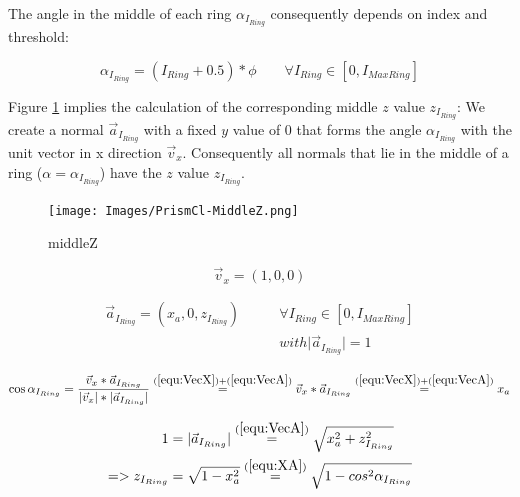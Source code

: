 \documentclass[../ClassicThesis.tex]{subfiles}
\begin{document}
The angle in the middle of each ring ${\alpha}_{I_{Ring}}$ consequently depends on index and threshold:

\begin{equation}
\label{equ:AlphaIRing}
    {\alpha}_{I_{Ring}} = (I_{Ring} + 0.5) * \phi \qquad \forall{ I_{Ring} \in [0, I_{MaxRing}] }
\end{equation}



Figure \ref{fig:middleZ} implies the calculation of the corresponding middle $z$ value $z_{I_{Ring}}$: We create a normal $\vec{a}_{I_{Ring}}$ with a fixed $y$ value of 0 that forms the angle ${\alpha}_{I_{Ring}}$ with the unit vector in x direction $\vec{v}_{x}$. Consequently all normals that lie in the middle of a ring ($\alpha = {\alpha}_{I_{Ring}}$) have the $z$ value $z_{I_{Ring}}$.

\begin{figure}
    \texttt{[image: Images/PrismCl-MiddleZ.png]}
    \caption{middleZ}
    \label{fig:middleZ}
\end{figure}

\begin{equation}
\label{equ:VecX}
    \vec{v}_{x} = (1, 0, 0)
\end{equation}

\begin{equation}
\begin{split}
    \label{equ:VecA}
    \vec{a}_{I_{Ring}} = (x_{a}, 0, z_{I_{Ring}}) \qquad  & \forall{ I_{Ring} \in [0, I_{MaxRing}] } \\
    & with \vert \vec{a}_{I_{Ring}} \vert = 1
\end{split}
\end{equation}

\begin{equation}
    \label{equ:XA}
    \cos{{\alpha}_{I_{Ring}}} = \frac{ \vec{v}_{x} * \vec{a}_{I_{Ring}} }{ \vert \vec{v}_{x} \vert * \vert \vec{a}_{I_{Ring}} \vert }
    \stackrel{(\ref{equ:VecX}) + (\ref{equ:VecA})}{=} \vec{v}_{x} * \vec{a}_{I_{Ring}}
    \stackrel{(\ref{equ:VecX}) + (\ref{equ:VecA})}{=} x_{a}
\end{equation}

\begin{equation}
\label{equ:ZIRing}
\begin{split}
    1 & = \vert \vec{a}_{I_{Ring}} \vert \stackrel{(\ref{equ:VecA})}{=} \sqrt{ x_{a}^{2} + z_{I_{Ring}}^{2} } \\
    => z_{I_{Ring}} & = \sqrt{1 - x_{a}^{2}} 
    \stackrel{(\ref{equ:XA})}{=} \sqrt{1 - cos^{2}{{\alpha}_{I_{Ring}}}}
\end{split}
\end{equation}
\end{document}
